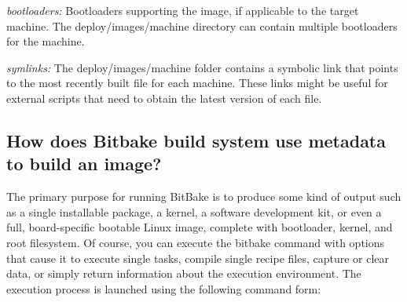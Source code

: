 \begin{DoxyItemize}
\begin{DoxyItemize}
\item {\itshape bootloaders\+:} Bootloaders supporting the image, if applicable to the target machine. The deploy/images/machine directory can contain multiple bootloaders for the machine.
\item {\itshape symlinks\+:} The deploy/images/machine folder contains a symbolic link that points to the most recently built file for each machine. These links might be useful for external scripts that need to obtain the latest version of each file.
\end{DoxyItemize}
\end{DoxyItemize}

\subsection*{How does Bitbake build system use metadata to build an image?}

The primary purpose for running Bit\+Bake is to produce some kind of output such as a single installable package, a kernel, a software development kit, or even a full, board-\/specific bootable Linux image, complete with bootloader, kernel, and root filesystem. Of course, you can execute the bitbake command with options that cause it to execute single tasks, compile single recipe files, capture or clear data, or simply return information about the execution environment. The execution process is launched using the following command form\+: 




